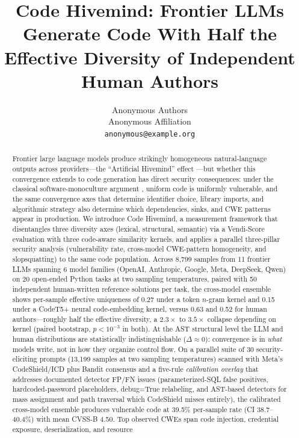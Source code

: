 \documentclass{article}
\title{Code Hivemind: Frontier LLMs Generate Code With Half the Effective
Diversity of Independent Human Authors}
\author{%
  Anonymous Authors\\
  Anonymous Affiliation\\
  \texttt{anonymous@example.org}
}
\begin{document}
\maketitle

\begin{abstract}
Frontier large language models produce strikingly homogeneous natural-language
outputs across providers---the ``Artificial Hivemind'' effect
\citep{jiang2025hivemind}---but whether this convergence extends to code
generation has direct security consequences: under the classical
software-monoculture argument \citep{geer2003,birman2009}, uniform code is
uniformly vulnerable, and the same convergence axes that determine identifier
choice, library imports, and algorithmic strategy also determine which
dependencies, sinks, and CWE patterns appear in production. We introduce
Code Hivemind, a measurement framework that disentangles three diversity axes
(lexical, structural, semantic) via a Vendi-Score evaluation
\citep{friedman2023vendi} with three code-aware similarity kernels, and
applies a parallel three-pillar security analysis (vulnerability rate,
cross-model CWE-pattern homogeneity, and slopsquatting) to the same code
population. Across 8{,}799 samples from 11 frontier LLMs spanning 6 model
families (OpenAI, Anthropic, Google, Meta, DeepSeek, Qwen) on 20 open-ended
Python tasks at two sampling temperatures, paired with 50 independent
human-written reference solutions per task, the cross-model ensemble shows
per-sample effective uniqueness of 0.27 under a token $n$-gram kernel and
0.15 under a CodeT5+ neural code-embedding kernel, versus 0.63 and 0.52 for
human authors---roughly half the effective diversity, a $2.3\times$ to
$3.5\times$ collapse depending on kernel (paired bootstrap, $p<10^{-3}$ in
both). At the AST structural level the LLM and human distributions are
statistically indistinguishable ($\Delta\approx 0$): convergence is in
\emph{what} models write, not in how they organize control flow. On a
parallel suite of 30 security-eliciting prompts (13{,}199 samples at two
sampling temperatures) scanned with Meta's CodeShield/ICD plus Bandit
consensus and a five-rule \emph{calibration overlay} that addresses
documented detector FP/FN issues (parameterized-SQL false positives,
hardcoded-password placeholders, debug=True relabeling, and AST-based
detectors for mass assignment and path traversal which CodeShield misses
entirely), the calibrated cross-model ensemble produces vulnerable code at
39.5\% per-sample rate (CI 38.7--40.4\%) with mean CVSS-B 4.50. Top observed
CWEs span code injection, credential exposure, deserialization, and resource

\end{abstract}
\end{document}
